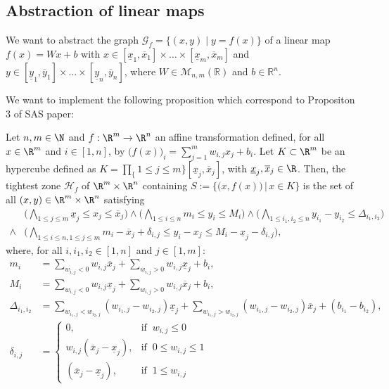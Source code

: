 \documentclass{article}
\begin{document}
\subsection{Abstraction of linear maps }

We want to abstract the graph \(\mathcal{G}_f = \{(x,y) \mid y = f(x)\}\) of a linear map \(f(x) = Wx + b\) with \(x \in [\underline{x}_1, \overline{x}_1] \times \ldots \times [\underline{x}_m, \overline{x}_m]\) and \(y \in [\underline{y}_1, \overline{y}_1] \times \ldots \times [\underline{y}_n, \overline{y}_n]\), where \(W \in \mathcal{M}_{n,m}(\mathbb{R})\) and \(b \in \mathbb{R}^n\).

We want to implement the following proposition which correspond to Propositon 3 of SAS paper:

\begin{proposition}

    Let $n,m\in\N$ and $f:\R^m\to\R^n$  an affine transformation defined, for all $x\in\R^m$ and $i\in[1,n]$, by
    $\big(f(x)\big)_i = \sum_{j=1}^m w_{i,j} x_j + b_i.$
Let $K\subset\R^m$ be an hypercube defined as $K=\prod_\{1 \leq j \leq m\} [\underline{x}_j, \overline{x}_j]$, with $\underline{x}_j,\overline{x}_j\in\R$.
%
    Then, the tightest zone $\mathcal{H}_f$ of $\R^m \times \R^n$ containing
    $S := \big\{\big(x,f(x)\big)\,\Big|\,x\in K \big\}$ 
    is the set of all $(x,y)\in\R^m\times\R^n$ satisfying
    \begin{align*}
     &\Big(\bigwedge_{1\leq j\leq m} \underline x_j\leq x_j \leq \overline x_j\Big)
      \wedge \Big(\bigwedge_{1\leq i\leq n} m_i\leq y_i \leq M_i\Big)
      \wedge \Big(\bigwedge_{1\leq i_1, i_2 \leq n} y_{i_1} - y_{i_2} \leq \Delta_{i_1,i_2}\Big) \\
       \wedge &\Big(\bigwedge_{1\leq i \leq n,1 \leq j \leq m} m_i - \overline x_j + \delta_{i,j} \leq y_i - x_j   \leq M_i - \underline x_j - \delta_{i,j} \Big),
    \end{align*}
    where, for all $i, i_1, i_2 \in [1,n]$ and $j \in [1,m]$:
    \begin{align*}
        m_i &= \sum_{w_{i,j}<0}w_{i,j}\overline x_j + \sum_{w_{i,j}>0}w_{i,j}\underline x_j + b_i, \\
        M_i &= \sum_{w_{i,j}<0}w_{i,j}\underline x_j + \sum_{w_{i,j}>0}w_{i,j}\overline x_j + b_i, \\
        \Delta_{i_1,i_2} &=  
                    \sum_{w_{i_1,j}<w_{i_2,j}} (w_{i_1,j}-w_{i_2,j})\underline x_j
                  + \sum_{w_{i_1,j}>w_{i_2,j}} (w_{i_1,j}-w_{i_2,j})\overline x_j + (b_{i_1} - b_{i_2}), \ \\
        \delta_{i,j} &=
        \begin{cases}
          0, & \text{if }\ w_{i,j} \leq 0 \\
          w_{i,j}(\overline x_j-\underline x_j), & \text{if }\ 0 \leq w_{i,j} \leq 1 \\
          (\overline x_j-\underline x_j), & \text{if }\ 1 \leq w_{i,j}
        \end{cases}
    \end{align*}
\end{proposition}
\end{document}
